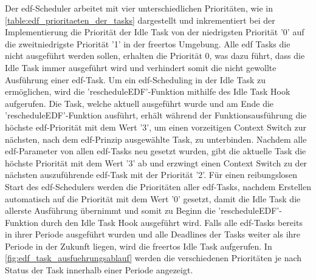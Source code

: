 \documentclass[../EDF Master Thesis.tex]{subfiles}
\begin{document}
    Der \ac{edf}-Scheduler arbeitet mit vier unterschiedlichen Prioritäten, wie in \autoref{table:edf_prioritaeten_der_tasks} dargestellt und inkrementiert bei der Implementierung die Priorität der Idle Task von der niedrigsten Priorität '0' auf die zweitniedrigste Priorität '1' in der \ac{freertos} Umgebung.
    Alle \ac{edf} Tasks die nicht ausgeführt werden sollen, erhalten die Priorität 0, was dazu führt, dass die Idle Task immer ausgeführt wird und verhindert somit die nicht gewollte Ausführung einer \ac{edf}-Task.
    Um ein \ac{edf}-Scheduling in der Idle Task zu ermöglichen, wird die 'rescheduleEDF'-Funktion mithilfe des Idle Task Hook aufgerufen.
    Die Task, welche aktuell ausgeführt wurde und am Ende die 'rescheduleEDF'-Funktion ausführt, erhält während der Funktionsausführung die höchste \ac{edf}-Priorität mit dem Wert '3', um einen vorzeitigen Context Switch zur nächsten, nach dem \ac{edf}-Prinzip ausgewählte Task, zu unterbinden.
    Nachdem alle \ac{edf}-Parameter von allen \ac{edf}-Tasks neu gesetzt wurden, gibt die aktuelle Task die höchste Priorität mit dem Wert '3' ab und erzwingt einen Context Switch zu der nächsten auszuführende \ac{edf}-Task mit der Priorität '2'.
    Für einen reibungslosen Start des \ac{edf}-Schedulers werden die Prioritäten aller \ac{edf}-Tasks, nachdem Erstellen automatisch auf die Priorität mit dem Wert '0' gesetzt, damit die Idle Task die allerste Ausführung übernimmt und somit zu Beginn die 'rescheduleEDF'-Funktion durch den Idle Task Hook ausgeführt wird.
    Falls alle \ac{edf}-Tasks bereits in ihrer Periode ausgeführt wurden und alle Deadlines der Tasks weiter als ihre Periode in der Zukunft liegen, wird die \ac{freertos} Idle Task aufgerufen.
    In \autoref{fig:edf_task_ausfuehrungsablauf} werden die verschiedenen Prioritäten je nach Status der Task innerhalb einer Periode angezeigt.
    
\end{document}
